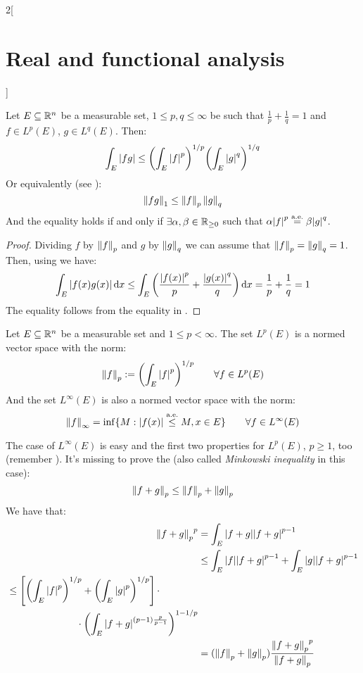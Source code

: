 \documentclass[../../../main_math.tex]{subfiles}
\begin{document}
\begin{multicols}{2}[\section{Real and functional analysis}]
  \begin{proposition}\label{RFA:holder}
    Let $E\subseteq\mathbb{R}^n$ be a measurable set, $1\leq p,q\leq \infty$ be such that $\frac{1}{p}+\frac{1}{q}=1$ and ${f}\in L^p(E)$, ${g}\in L^q(E)$. Then:
    $$\int_E\abs{fg}\leq {\left(\int_E\abs{f}^p\right)}^{1/p}{\left(\int_E\abs{g}^q\right)}^{1/q}$$
    Or equivalently (see ):
    $$\left\|{fg}\right\|_1\leq\left\|{f}\right\|_p\left\|{g}\right\|_q$$
    And the equality holds if and only if $\exists \alpha,\beta\in\mathbb{R}_{\geq 0}$ such that $\alpha{\abs{{f}}}^p\overset{\text{a.e.}}{=}\beta{\abs{{g}}}^q$.
  \end{proposition}
  \begin{proof}
    Dividing $f$ by $\left\|f\right\|_p$ and $g$ by $\left\|g\right\|_q$ we can assume that $\left\|f\right\|_p=\left\|g\right\|_q=1$. Then, using  we have:
    $$\int_E\abs{f(x)g(x)}\dd{x}\leq\int_E\left(\frac{\abs{f(x)}^p}{p}+\frac{\abs{g(x)}^q}{q}\right)\dd{x}=\frac{1}{p}+\frac{1}{q}=1$$
    The equality follows from the equality in .
  \end{proof}
  \begin{proposition}\label{RFA:lpnorm}
    Let $E\subseteq\mathbb{R}^n$ be a measurable set and $1\leq p<\infty$. The set $L^p(E)$ is a normed vector space with the norm: $$\left\|{f}\right\|_p:={\left(\int_E\abs{{f}}^p\right)}^{1/p}\qquad\forall{f}\in L^p(E)$$
    And the set $L^\infty(E)$ is also a normed vector space with the norm: $$\left\|{f}\right\|_\infty=\inf \{M:\abs{{f}(x)}\overset{\text{a.e.}}{\leq} M, x\in E\}\qquad\forall{f}\in L^\infty(E)$$
  \end{proposition}
  \begin{sproof}
    The case of $L^\infty(E)$ is easy and the first two properties for $L^p(E)$, $p\geq 1$, too (remember ). It's missing to prove the  (also called \emph{Minkowski inequality} in this case): $$\left\|f+g\right\|_p\leq \left\|f\right\|_p+\left\|g\right\|_p$$
    We have that:
    \begin{align*}
      {\left\|f+g\right\|_p}^p & =\int_E\abs{f+g}\abs{f+g}^{p-1}                                            \\
                       & \leq \int_E\abs{f}\abs{f+g}^{p-1}+\int_E\abs{g}\abs{f+g}^{p-1}             \\
      \begin{split}
        & \leq \left[{\left(\int_E\abs{f}^p\right)}^{1/p}+{\left(\int_E\abs{g}^p\right)}^{1/p}\right]\cdot \\
        &\hspace{2.5cm}\cdot{\left(\int_E\abs{f+g}^{(p-1)\frac{p}{p-1}}\right)}^{1-1/p}
      \end{split} \\
                       & =(\left\|f\right\|_p+\left\|g\right\|_p)\frac{{\left\|f+g\right\|_p}^p }{{\left\|f+g\right\|_p}}
    \end{align*}
  \end{sproof}

\end{multicols}
\end{document}
